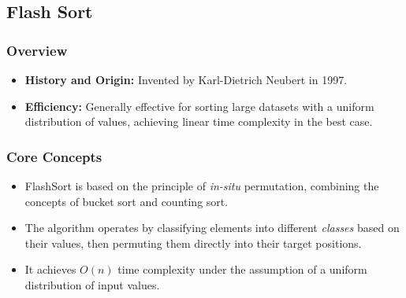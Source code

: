 \subsection[Flash Sort]{Flash Sort\cite{neubert1997flashsort}}
    \subsubsection{Overview}
        \begin{itemize}
            \item \textbf{History and Origin:} Invented by Karl-Dietrich Neubert in 1997.
            \item \textbf{Efficiency:} Generally effective for sorting large datasets with a uniform distribution of values, achieving linear time complexity in the best case.
        \end{itemize}
    \subsubsection{Core Concepts}
        \begin{itemize}
            \item FlashSort is based on the principle of \textit{in-situ} permutation, combining the concepts of bucket sort and counting sort.
            \item The algorithm operates by classifying elements into different \textit{classes} based on their values, then permuting them directly into their target positions.
            \item It achieves $O(n)$ time complexity under the assumption of a uniform distribution of input values.
        \end{itemize}

